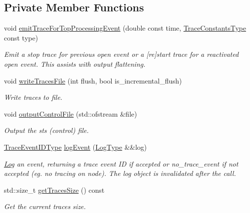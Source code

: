 \subsection*{Private Member Functions}
\begin{DoxyCompactItemize}
\item 
void \hyperlink{structvt_1_1trace_1_1_trace_a379bc0fb498dc794d75f8b44c6f940b2}{emit\+Trace\+For\+Top\+Processing\+Event} (double const time, \hyperlink{namespacevt_1_1trace_acf454dfbd581b0ebae895f90b5927a1d}{Trace\+Constants\+Type} const type)
\begin{DoxyCompactList}\small\item\em Emit a \textquotesingle{}stop\textquotesingle{} trace for previous open event or a \textquotesingle{}\mbox{[}re\mbox{]}start\textquotesingle{} trace for a reactivated open event. This assists with output flattening. \end{DoxyCompactList}\item 
void \hyperlink{structvt_1_1trace_1_1_trace_a7d0fc2fd82be06ecd24bf4e2b33ac52b}{write\+Traces\+File} (int flush, bool is\+\_\+incremental\+\_\+flush)
\begin{DoxyCompactList}\small\item\em Write traces to file. \end{DoxyCompactList}\item 
void \hyperlink{structvt_1_1trace_1_1_trace_a90d5f7400d362293c78f041cb42fce35}{output\+Control\+File} (std\+::ofstream \&file)
\begin{DoxyCompactList}\small\item\em Output the sts (control) file. \end{DoxyCompactList}\item 
\hyperlink{namespacevt_1_1trace_a64a7185f3e102df8d8258f263ccd1582}{Trace\+Event\+I\+D\+Type} \hyperlink{structvt_1_1trace_1_1_trace_add92bd2da3d78dd7ad2f1112583c4596}{log\+Event} (\hyperlink{structvt_1_1trace_1_1_trace_a43306d96a91e49db081eaea016f1dd0a}{Log\+Type} \&\&log)
\begin{DoxyCompactList}\small\item\em \hyperlink{structvt_1_1trace_1_1_log}{Log} an event, returning a trace event ID if accepted or {\ttfamily no\+\_\+trace\+\_\+event} if not accepted (eg. no tracing on node). The log object is invalidated after the call. \end{DoxyCompactList}\item 
std\+::size\+\_\+t \hyperlink{structvt_1_1trace_1_1_trace_a502cebeb41c667ecce682191c69dacd5}{get\+Traces\+Size} () const
\begin{DoxyCompactList}\small\item\em Get the current traces size. \end{DoxyCompactList}\end{DoxyCompactItemize}
